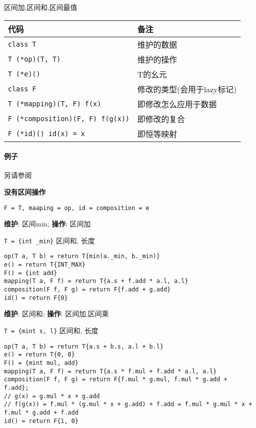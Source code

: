 区间加,区间和,区间最值

\begin{tabular}{ll}
    \hline
    代码                                  & 备注                       \\
    \hline
    \verb|class T|                        & 维护的数据                 \\
    \verb|T (*op)(T, T)|                  & 维护的操作                 \\
    \verb|T (*e)()|                       & T的幺元                    \\
    \verb|class F|                        & 修改的类型(会用于lazy标记) \\
    \verb|T (*mapping)(T, F) f(x)|        & 即修改怎么应用于数据       \\
    \verb|F (*composition)(F, F) f(g(x))| & 即修改的复合               \\
    \verb|F (*id)() id(x) = x|            & 即恒等映射                 \\
    \hline
\end{tabular}

\paragraph{例子}

另请参阅 

\textbf{没有区间操作}

\verb|F = T, maaping = op, id = composition = e|

\textbf{维护}: 区间min; \textbf{操作}: 区间加

\verb|T = {int _min}| 区间和, 长度

\begin{verbatim}
op(T a, T b) = return T{min(a._min, b._min)}
e() = return T{INT_MAX}
F() = {int add}
mapping(T a, F f) = return T{a.s + f.add * a.l, a.l}
composition(F f, F g) = return F{f.add + g.add}
id() = return F{0}
\end{verbatim}

\textbf{维护}: 区间和; \textbf{操作}: 区间加,区间乘

\verb|T = {mint s, l}| 区间和, 长度

\begin{verbatim}
op(T a, T b) = return T{a.s + b.s, a.l + b.l}
e() = return T{0, 0}
F() = {mint mul, add}
mapping(T a, F f) = return T{a.s * f.mul + f.add * a.l, a.l}
composition(F f, F g) = return F{f.mul * g.mul, f.mul * g.add + f.add};
// g(x) = g.mul * x + g.add
// f(g(x)) = f.mul * (g.mul * x + g.add) + f.add = f.mul * g.mul * x + f.mul * g.add + f.add
id() = return F{1, 0}
\end{verbatim}
